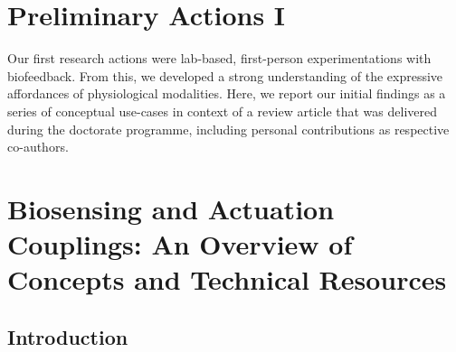 \section{Preliminary Actions I}
\label{cha:Preliminary_Actions_sens_act}

Our first research actions were lab-based, first-person experimentations  with biofeedback. From this, we developed a strong understanding of the expressive affordances of physiological modalities. Here, we report our initial findings as a series of conceptual use-cases in context of a review article that was delivered during the doctorate programme, including personal contributions as respective co-authors.



\section{Biosensing and Actuation Couplings: An Overview of Concepts and Technical Resources}

\subsection{Introduction}

